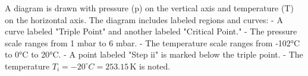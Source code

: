 A diagram is drawn with pressure (p) on the vertical axis and temperature (T) on the horizontal axis. The diagram includes labeled regions and curves:  
- A curve labeled "Triple Point" and another labeled "Critical Point."  
- The pressure scale ranges from 1 mbar to 6 mbar.  
- The temperature scale ranges from -102°C to 0°C to 20°C.  
- A point labeled "Step ii" is marked below the triple point.  
- The temperature \( T_i = -20^\circ C = 253.15 \, \text{K} \) is noted.